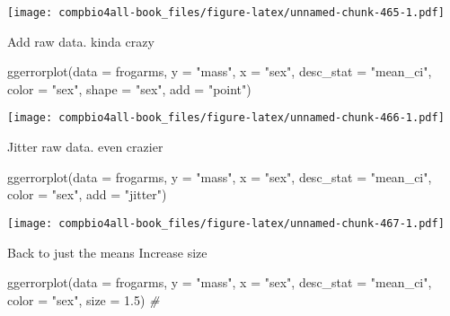 \documentclass[
]{book}
\newenvironment{Shaded}{\begin{snugshade}}{\end{snugshade}}
\newcommand{\AttributeTok}[1]{\textcolor[rgb]{0.77,0.63,0.00}{#1}}
\newcommand{\CommentTok}[1]{\textcolor[rgb]{0.56,0.35,0.01}{\textit{#1}}}
\newcommand{\FloatTok}[1]{\textcolor[rgb]{0.00,0.00,0.81}{#1}}
\newcommand{\FunctionTok}[1]{\textcolor[rgb]{0.00,0.00,0.00}{#1}}
\newcommand{\NormalTok}[1]{#1}
\newcommand{\StringTok}[1]{\textcolor[rgb]{0.31,0.60,0.02}{#1}}
\begin{document}
\texttt{[image: compbio4all-book\_files/figure-latex/unnamed-chunk-465-1.pdf]}

Add raw data. kinda crazy

\begin{Shaded}
\begin{Highlighting}[]
\FunctionTok{ggerrorplot}\NormalTok{(}\AttributeTok{data =}\NormalTok{ frogarms,}
          \AttributeTok{y =} \StringTok{"mass"}\NormalTok{,}
          \AttributeTok{x =} \StringTok{"sex"}\NormalTok{,}
          \AttributeTok{desc\_stat =} \StringTok{"mean\_ci"}\NormalTok{,}
          \AttributeTok{color =} \StringTok{"sex"}\NormalTok{,}
          \AttributeTok{shape =} \StringTok{"sex"}\NormalTok{,}
          \AttributeTok{add =} \StringTok{"point"}\NormalTok{)}
\end{Highlighting}
\end{Shaded}

\texttt{[image: compbio4all-book\_files/figure-latex/unnamed-chunk-466-1.pdf]}

Jitter raw data. even crazier

\begin{Shaded}
\begin{Highlighting}[]
\FunctionTok{ggerrorplot}\NormalTok{(}\AttributeTok{data =}\NormalTok{ frogarms,}
          \AttributeTok{y =} \StringTok{"mass"}\NormalTok{,}
          \AttributeTok{x =} \StringTok{"sex"}\NormalTok{,}
          \AttributeTok{desc\_stat =} \StringTok{"mean\_ci"}\NormalTok{,}
          \AttributeTok{color =} \StringTok{"sex"}\NormalTok{,}
          \AttributeTok{add =} \StringTok{"jitter"}\NormalTok{)}
\end{Highlighting}
\end{Shaded}

\texttt{[image: compbio4all-book\_files/figure-latex/unnamed-chunk-467-1.pdf]}

Back to just the means Increase size

\begin{Shaded}
\begin{Highlighting}[]
\FunctionTok{ggerrorplot}\NormalTok{(}\AttributeTok{data =}\NormalTok{ frogarms,}
          \AttributeTok{y =} \StringTok{"mass"}\NormalTok{,}
          \AttributeTok{x =} \StringTok{"sex"}\NormalTok{,}
          \AttributeTok{desc\_stat =} \StringTok{"mean\_ci"}\NormalTok{,}
          \AttributeTok{color =} \StringTok{"sex"}\NormalTok{,}
          \AttributeTok{size =} \FloatTok{1.5}\NormalTok{) }\CommentTok{\#}
\end{Highlighting}
\end{Shaded}
\end{document}
